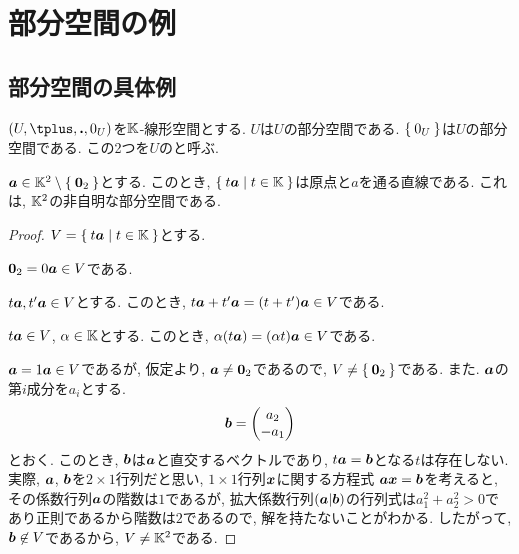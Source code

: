 \section{部分空間の例}
\subsection{部分空間の具体例}
\label{sec:subspace:example}
\begin{example}
  $(U,\plus ,\act,0_U)$を$\mathbb{K}$-線形空間とする.
  $U$は$U$の部分空間である.
  $\Set{0_U}$は$U$の部分空間である.
  この2つを$U$のと呼ぶ.
\end{example}

\begin{example}
  $\boldsymbol{a}\in \mathbb{K}^2\setminus\Set{\boldsymbol{0}_2}$とする.
  このとき, $\Set{t\boldsymbol{a}|t\in \mathbb{K}}$は原点と$a$を通る直線である.
  これは, $\mathbb{K}^2$の非自明な部分空間である.
\end{example}
\begin{proof}
$V=\Set{t\boldsymbol{a}|t\in \mathbb{K}}$とする.

$\boldsymbol{0}_2=0\boldsymbol{a}\in V$である.

$t\boldsymbol{a}, t'\boldsymbol{a}\in V$とする.
このとき, $t\boldsymbol{a}+t'\boldsymbol{a}=(t+t')\boldsymbol{a}\in V$である.

$t\boldsymbol{a}\in V$, $\alpha\in \mathbb{K}$とする.
このとき, $\alpha (t\boldsymbol{a})=(\alpha t)\boldsymbol{a}\in V$である.

$\boldsymbol{a}=1\boldsymbol{a}\in V$であるが,
仮定より, $\boldsymbol{a}\neq \boldsymbol{0}_2$であるので, $V\neq \Set{\boldsymbol{0}_2}$である.
また. $\boldsymbol{a}$の第$i$成分を$a_i$とする.
\begin{align*}
\boldsymbol{b}=
\begin{pmatrix}
a_2\\-a_1
\end{pmatrix}
\end{align*}
とおく.
このとき, $\boldsymbol{b}$は$\boldsymbol{a}$と直交するベクトルであり,
$t\boldsymbol{a}=\boldsymbol{b}$となる$t$は存在しない.
実際, $\boldsymbol{a}$, $\boldsymbol{b}$を$2\times 1$行列だと思い,
$1\times 1$行列$\boldsymbol{x}$に関する方程式
$\boldsymbol{a} \boldsymbol{x} =\boldsymbol{b}$を考えると,
その係数行列$\boldsymbol{a}$の階数は$1$であるが,
拡大係数行列$(\boldsymbol{a}|\boldsymbol{b})$の行列式は$a_1^2+a_2^2>0$であり正則であるから階数は$2$であるので, 解を持たないことがわかる.
したがって, $\boldsymbol{b}\not\in V$であるから, $V\neq\mathbb{K}^2$である.
\end{proof}


